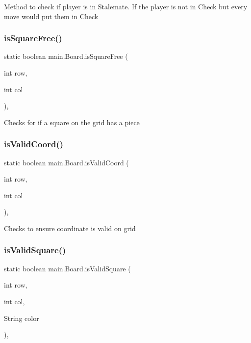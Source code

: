 Method to check if player is in Stalemate. If the player is not in Check but every move would put them in Check \mbox{\label{classmain_1_1_board_a425efbefafed1b93e1ddb92cbc914591}} 
\subsubsection{\texorpdfstring{is\+Square\+Free()}{isSquareFree()}}
{\footnotesize\ttfamily static boolean main.\+Board.\+is\+Square\+Free (\begin{DoxyParamCaption}\item[{int}]{row,  }\item[{int}]{col }\end{DoxyParamCaption})\hspace{0.3cm}{\ttfamily [inline]}, {\ttfamily [static]}}

Checks for if a square on the grid has a piece \mbox{\label{classmain_1_1_board_aa6fcd07faec07bf9b093b3de3d96732c}} 
\subsubsection{\texorpdfstring{is\+Valid\+Coord()}{isValidCoord()}}
{\footnotesize\ttfamily static boolean main.\+Board.\+is\+Valid\+Coord (\begin{DoxyParamCaption}\item[{int}]{row,  }\item[{int}]{col }\end{DoxyParamCaption})\hspace{0.3cm}{\ttfamily [inline]}, {\ttfamily [static]}}

Checks to ensure coordinate is valid on grid \mbox{\label{classmain_1_1_board_a9e7b3d4970ecf07f4d41862a5dd2c23c}} 
\subsubsection{\texorpdfstring{is\+Valid\+Square()}{isValidSquare()}}
{\footnotesize\ttfamily static boolean main.\+Board.\+is\+Valid\+Square (\begin{DoxyParamCaption}\item[{int}]{row,  }\item[{int}]{col,  }\item[{String}]{color }\end{DoxyParamCaption})\hspace{0.3cm}{\ttfamily [inline]}, {\ttfamily [static]}}

